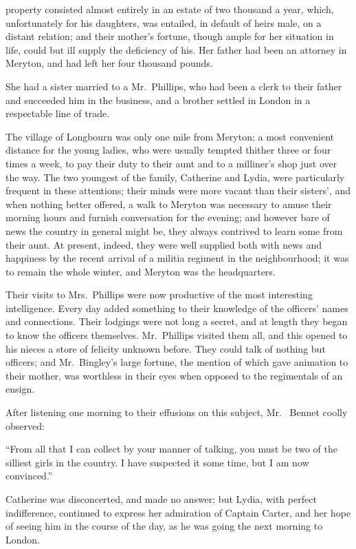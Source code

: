  property consisted almost entirely in an estate of
two thousand a year, which, unfortunately for his daughters, was
entailed, in default of heirs male, on a distant relation; and their
mother's fortune, though ample for her situation in life, could
but ill supply the deficiency of his.  Her father had been an
attorney in Meryton, and had left her four thousand pounds.

She had a sister married to a Mr.\ Phillips, who had been a clerk
to their father and succeeded him in the business, and a brother
settled in London in a respectable line of trade.

The village of Longbourn was only one mile from Meryton; a
most convenient distance for the young ladies, who were usually
tempted thither three or four times a week, to pay their duty to
their aunt and to a milliner's shop just over the way.  The two
youngest of the family, Catherine and Lydia, were particularly
frequent in these attentions; their minds were more vacant than
their sisters', and when nothing better offered, a walk to
Meryton was necessary to amuse their morning hours and
furnish conversation for the evening; and however bare of news
the country in general might be, they always contrived to learn
some from their aunt.  At present, indeed, they were well
supplied both with news and happiness by the recent arrival of
a militia regiment in the neighbourhood; it was to remain the
whole winter, and Meryton was the headquarters.

Their visits to Mrs.\ Phillips were now productive of the most
interesting intelligence.  Every day added something to their
knowledge of the officers' names and connections.  Their
lodgings were not long a secret, and at length they began to
know the officers themselves.  Mr.\ Phillips visited them all, and
this opened to his nieces a store of felicity unknown before.
They could talk of nothing but officers; and Mr.\ Bingley's large
fortune, the mention of which gave animation to their mother,
was worthless in their eyes when opposed to the regimentals of
an ensign.

After listening one morning to their effusions on this subject, Mr.\ %
Bennet coolly observed:

``From all that I can collect by your manner of talking, you must
be two of the silliest girls in the country.  I have suspected it
some time, but I am now convinced.''

Catherine was disconcerted, and made no answer; but Lydia,
with perfect indifference, continued to express her admiration of
Captain Carter, and her hope of seeing him in the course of the
day, as he was going the next morning to London.

